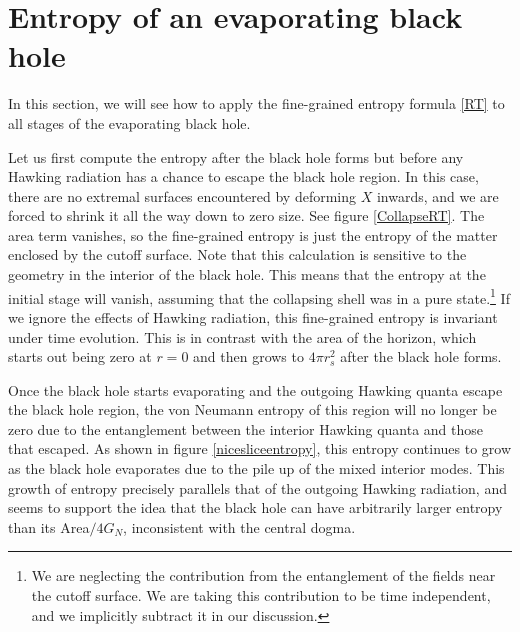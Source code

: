 




\section{Entropy of an evaporating black hole}



In this section, we will see how to apply the fine-grained entropy  formula \eqref{RT} to all stages of the evaporating black hole.  










	Let us first compute the entropy after the black hole forms but before any Hawking radiation has a chance to escape the black hole region.
	In this case, there are no extremal surfaces encountered by deforming $X$ inwards, and we are forced to shrink it all the way down to zero size.  See figure \ref{CollapseRT}. The area term vanishes, so the fine-grained entropy is just the entropy of the matter enclosed by the cutoff surface. 
	Note that this calculation is sensitive to the geometry in the interior of the black hole.  	This means that the entropy at the initial stage will vanish,  assuming that the collapsing shell was in a pure state.\footnote{   We are neglecting the contribution from the  entanglement of the fields near the cutoff surface. We are taking this contribution to be time independent, and we implicitly subtract it in our discussion.}   If we ignore the effects of Hawking radiation, this fine-grained entropy is invariant under time evolution. This is in contrast with the area of the horizon, which starts out being zero at $r=0$ and then grows to $4\pi r_s^2$ after the black hole forms. 
	





Once the black hole starts evaporating and the outgoing Hawking quanta escape the black hole region, the von Neumann entropy of this region will no longer be zero due to the entanglement between the interior Hawking quanta and those that escaped. As shown in figure \ref{nicesliceentropy}, this entropy continues to grow as the black hole evaporates due to the pile up of the mixed interior modes. This growth of  entropy precisely parallels that of the outgoing Hawking radiation, and seems to support the idea that the black hole can have arbitrarily larger entropy than its Area$/4G_N$, inconsistent with the central dogma. 


